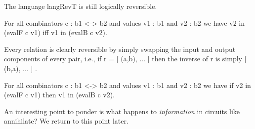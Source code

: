 \documentclass{llncs}
\begin{document}
\begin{definition}
\end{definition}

The language {{langRevT}} is still logically reversible. 

\begin{proposition}
\label{chx:prop:logrev-tracep}
For all combinators {{c : b1 <-> b2}} and values {{v1 : b1}} and 
{{v2 : b2}} we have {{v2 in (evalF c v1)}} iff
{{v1 in (evalB c v2)}}.
\end{proposition}

Every relation is clearly reversible by simply swapping the input and
output components of every pair, i.e., if {{r = {[ (a,b), ... ]} }}
then the inverse of {{r}} is simply {{ {[ (b,a), ... ]} }}. 

\begin{proposition}
\label{prop:logrev-tracet}
For all combinators {{c : b1 <-> b2}} and values {{v1 : b1}} and 
{{v2 : b2}} we have if {{v2 in (evalF c v1)}} then 
{{v1 in (evalB c v2)}}.
\end{proposition}

An interesting point to ponder is what happens to \emph{information}
in circuits like {{annihilate}}? We return to this point later.
\end{document}
